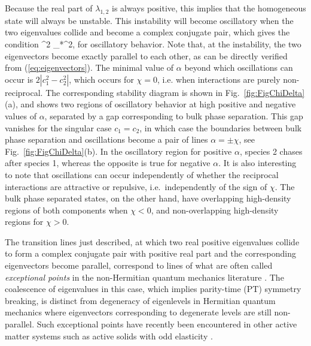 \eeq
Because the real part of $\lambda_{1,2}$ is always positive, this implies that the homogeneous state will always be unstable. This instability will become oscillatory when the two eigenvalues collide and become a complex conjugate pair, which gives the condition 
\beq
\alpha^2 \geq \alpha_*^2,
\eeq
for oscillatory behavior. Note that, at the instability, the two eigenvectors become exactly parallel to each other, as can be directly verified from (\ref{eq:eigenvectors}). The minimal value of $\alpha$ beyond which oscillations can occur is $2 |c_1^2-c_2^2|$, which occurs for $\chi = 0$, i.e. when interactions are purely non-reciprocal. The corresponding stability diagram is shown in Fig.~\ref{fig:FigChiDelta}(a), and shows two regions of oscillatory behavior at high positive and negative values of $\alpha$, separated by a gap corresponding to bulk phase separation. This gap vanishes for the singular case $c_1=c_2$, in which case the boundaries between bulk phase separation and oscillations become a pair of lines $\alpha = \pm \chi$, see Fig.~\ref{fig:FigChiDelta}(b). In the oscillatory region for positive $\alpha$, species 2 chases after species 1, whereas the opposite is true for negative $\alpha$. It is also interesting to note that oscillations can occur independently of whether the reciprocal interactions are attractive or repulsive, i.e.~independently of the sign of $\chi$. The bulk phase separated states, on the other hand, have overlapping high-density regions of both components when $\chi < 0$, and non-overlapping high-density regions for $\chi>0$.



The transition lines just described, at which two real positive eigenvalues collide to form a complex conjugate pair with positive real part and the corresponding eigenvectors become parallel, correspond to lines of what are often called \emph{exceptional points} in the non-Hermitian quantum mechanics literature \cite{Kato1995,Heiss_2012}. The coalescence of eigenvalues in this case, which implies parity-time (PT) symmetry breaking, is distinct from degeneracy of eigenlevels in Hermitian quantum mechanics where eigenvectors corresponding to degenerate levels are still non-parallel. Such exceptional points have recently been encountered in other active matter systems such as active solids with odd elasticity \cite{Scheibner2020}.




\newpage
